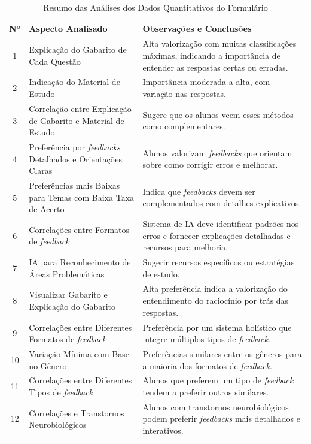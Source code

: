 \clearpage

\begin{table}[H]
\centering
\begin{tabular}{|c|p{6cm}|p{8cm}|}
\hline
\textbf{Nº} & \textbf{Aspecto Analisado} & \textbf{Observações e Conclusões} \\
\hline
1 & Explicação do Gabarito de Cada Questão & Alta valorização com muitas classificações máximas, indicando a importância de entender as respostas certas ou erradas. \\
\hline
2 & Indicação do Material de Estudo & Importância moderada a alta, com variação nas respostas. \\
\hline
3 & Correlação entre Explicação de Gabarito e Material de Estudo & Sugere que os alunos veem esses métodos como complementares. \\
\hline
4 & Preferência por \textit{feedbacks} Detalhados e Orientações Claras & Alunos valorizam \textit{feedbacks} que orientam sobre como corrigir erros e melhorar. \\
\hline
5 & Preferências mais Baixas para Temas com Baixa Taxa de Acerto & Indica que \textit{feedbacks} devem ser complementados com detalhes explicativos. \\
\hline
6 & Correlações entre Formatos de \textit{feedback} & Sistema de IA deve identificar padrões nos erros e fornecer explicações detalhadas e recursos para melhoria. \\
\hline
7 & IA para Reconhecimento de Áreas Problemáticas & Sugerir recursos específicos ou estratégias de estudo. \\
\hline
8 & Visualizar Gabarito e Explicação do Gabarito & Alta preferência indica a valorização do entendimento do raciocínio por trás das respostas. \\
\hline
9 & Correlações entre Diferentes Formatos de \textit{feedback} & Preferência por um sistema holístico que integre múltiplos tipos de \textit{feedback}. \\
\hline
10 & Variação Mínima com Base no Gênero & Preferências similares entre os gêneros para a maioria dos formatos de \textit{feedback}. \\
\hline
11 & Correlações entre Diferentes Tipos de \textit{feedback} & Alunos que preferem um tipo de \textit{feedback} tendem a preferir outros similares. \\
\hline
12 & Correlações e Transtornos Neurobiológicos & Alunos com transtornos neurobiológicos podem preferir \textit{feedbacks} mais detalhados e interativos. \\
\hline
\end{tabular}
\caption{Resumo das Análises dos Dados Quantitativos do Formulário}
\end{table}

